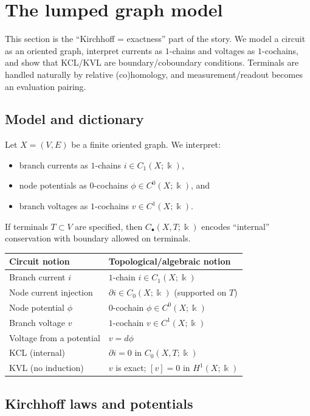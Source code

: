 \documentclass[11pt]{article}
\begin{document}
\section{The lumped graph model}
\label{sec:lumped-graph}
This section is the ``Kirchhoff = exactness'' part of the story.
We model a circuit as an oriented graph, interpret currents as $1$-chains and voltages as $1$-cochains, and show that KCL/KVL are boundary/coboundary conditions.
Terminals are handled naturally by relative (co)homology, and measurement/readout becomes an evaluation pairing.

\subsection{Model and dictionary}
Let $X=(V,E)$ be a finite oriented graph.
We interpret:
\begin{itemize}
  \item branch currents as $1$-chains $i\in C_1(X;\Bbbk)$,
  \item node potentials as $0$-cochains $\phi\in C^0(X;\Bbbk)$, and
  \item branch voltages as $1$-cochains $v\in C^1(X;\Bbbk)$.
\end{itemize}
If terminals $T\subset V$ are specified, then $C_\bullet(X,T;\Bbbk)$ encodes ``internal'' conservation with boundary allowed on terminals.

\begin{center}
\begin{tabularx}{0.98\textwidth}{p{}X}
\hline
Circuit notion & Topological/algebraic notion \\
\hline
Branch current $i$ & $1$-chain $i\in C_1(X;\Bbbk)$ \\
Node current injection & $\partial i\in C_0(X;\Bbbk)$ (supported on $T$) \\
Node potential $\phi$ & $0$-cochain $\phi\in C^0(X;\Bbbk)$ \\
Branch voltage $v$ & $1$-cochain $v\in C^1(X;\Bbbk)$ \\
Voltage from a potential & $v=d\phi$ \\
KCL (internal) & $\partial i=0$ in $C_0(X,T;\Bbbk)$ \\
KVL (no induction) & $v$ is exact; $[v]=0$ in $H^1(X;\Bbbk)$ \\
\hline
\end{tabularx}
\end{center}

\subsection{Kirchhoff laws and potentials}
\end{document}

